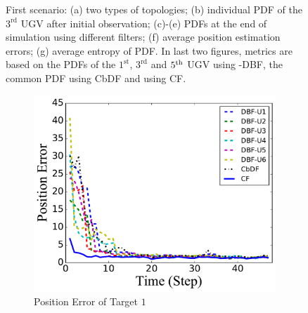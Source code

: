 \begin{figure}
		\caption{First scenario: (a) two types of topologies; (b) individual PDF of the $3^\text{rd}$ UGV after initial observation; (c)-(e) PDFs at the end of simulation using different filters; (f) average position estimation errors; (g) average entropy of PDF. In last two figures, metrics are based on the PDFs of the $1^\text{st}$, $3^\text{rd}$ and $5^\text{th}$ UGV using \proto-DBF, the common PDF using CbDF and using CF.}
		\label{fig:mov_sen_mov_tar1}
	\end{figure}
	
	\begin{figure}%
		\centering
		\begin{subfigure}[b]{0.23\textwidth}
			\includegraphics[width=\textwidth]{figures/hetero_mov_sen_mov_tar_pos_err_noise_linear}
			\caption{Position Error of Target $1$}\label{fig:lin_pos_err}
		\end{subfigure}				
		\begin{subfigure}[b]{0.23\textwidth}

\end{subfigure}
\end{figure}
